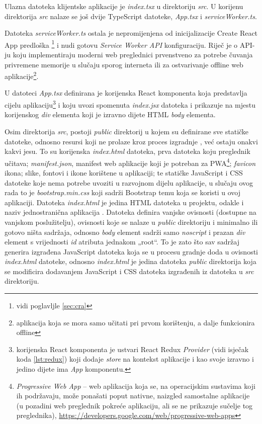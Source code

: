 \documentclass[times, utf8, diplomski, numeric]{fer}
\newcommand{\razmakp}{\vspace{18pt}}
\begin{document}
Ulazna datoteka klijentske aplikacije je \emph{index.tsx} u direktoriju \emph{src}.
U korijenu direktorija \emph{src} nalaze se još dvije TypeScript datoteke, \emph{App.tsx} i \emph{serviceWorker.ts}.

Datoteka \emph{serviceWorker.ts} ostala je nepromijenjena od inicijalizacije Create React App predloška \footnote{vidi poglavljle \ref{sec:cra}} i nudi gotovu \emph{Service Worker API} konfiguraciju.
Riječ je o API-ju koju implementiraju moderni web preglednici prvenstveno za potrebe čuvanja privremene memorije  u slučaju sporog interneta ili za ostvarivanje offline web aplikacije\footnote{
    aplikacija koja se mora samo učitati pri prvom korištenju, a dalje funkcionira offline
}.

U datoteci \emph{App.tsx} definirana je korijenska React komponenta koja predstavlja cijelu aplikaciju\footnote{
    korijenska React komponenta je ustvari React Redux \emph{Provider} (vidi isječak koda \ref{lst:redux}) koji dodaje \emph{store} na kontekst aplikacije i kao svoje izravno i jedino dijete ima \emph{App} komponentu.
} i koju uvozi  spomenuta \emph{index.jsx} datoteka i prikazuje  na mjestu korijenskog \emph{div} elementa koji je izravno dijete HTML \emph{body} elementa.

\razmakp

Osim direktorija \emph{src}, postoji \emph{public} direktorij u kojem su definirane sve statičke datoteke, odnosno resursi koji ne prolaze kroz proces izgradnje , već ostaju onakvi kakvi jesu.
To su korijenska \emph{index.html} datoteka, prva datoteka koju preglednik učitava; \emph{manifest.json}, manifest web aplikacije koji je potreban za PWA\footnote{
    \emph{Progressive Web App} -- web aplikacija koja se, na operacijskim sustavima koji ih podržavaju, može ponašati poput nativne, naizgled samostalne aplikacije (u pozadini web preglednik pokreće aplikaciju, ali se ne prikazuje sučelje tog preglednika), \url{https://developers.google.com/web/progressive-web-apps}
}; \emph{favicon} ikona; slike, fontovi i ikone korištene u aplikaciji; te statičke JavaScript i CSS datoteke koje nema potrebe uvoziti u razvojnom dijelu aplikacije, u slučaju ovog rada to je \emph{bootstrap.min.css} koji sadrži Bootstrap temu koja se koristi u ovoj aplikaciji.
Datoteka \emph{index.html} je jedina HTML datoteka u projektu, odakle i naziv jednostranična aplikacija .
Datoteka definira vanjske ovisnosti (dostupne na vanjskom poslužitelju), ovisnosti koje se nalaze u \emph{public} direktoriju i minimalno ili gotovo ništa sadržaja, odnosno \emph{body} element sadrži samo \emph{noscript} i prazan \emph{div} element s vrijednosti \emph{id} atributa jednakom „root“.
To je zato što sav sadržaj generira izgrađena JavaScript datoteka koja se u procesu gradnje doda u ovisnosti \emph{index.html} datoteke, odnosno \emph{index.html} je jedina datoteka \emph{public} direktorija koja se modificira dodavanjem JavaScript i CSS datoteka izgrađenih iz datoteka u \emph{src} direktoriju.
\end{document}
